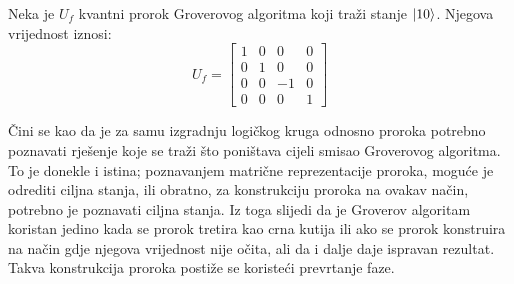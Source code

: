 Neka je $U_f$ kvantni prorok Groverovog algoritma koji traži stanje $\ket{10}$. Njegova vrijednost iznosi:
\begin{equation}
U_f = \begin{bmatrix}
1 & 0 & 0 & 0 \\
0 & 1 & 0 & 0 \\
0 & 0 & -1 & 0 \\
0 & 0 & 0 & 1
\end{bmatrix}
\end{equation}

Čini se kao da je za samu izgradnju logičkog kruga odnosno proroka potrebno poznavati rješenje koje se traži što poništava cijeli smisao Groverovog algoritma. To je donekle i istina; poznavanjem matrične reprezentacije proroka, moguće je odrediti ciljna stanja, ili obratno, za konstrukciju proroka na ovakav način, potrebno je poznavati ciljna stanja. Iz toga slijedi da je Groverov algoritam koristan jedino kada se prorok tretira kao crna kutija ili ako se prorok konstruira na način gdje njegova vrijednost nije očita, ali da i dalje daje ispravan rezultat. Takva konstrukcija proroka postiže se koristeći prevrtanje faze.

